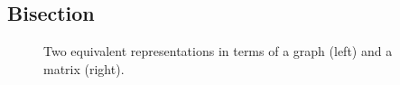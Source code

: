 \documentclass[12pt, oneside]{book}
\begin{document}
\subsection{Bisection}
\cite{2014:02}
\begin{figure}
\centering
{}%
\caption{Two equivalent representations in terms of a graph (left) and a matrix (right).}
\label{initial}
\end{figure}
\end{document}
